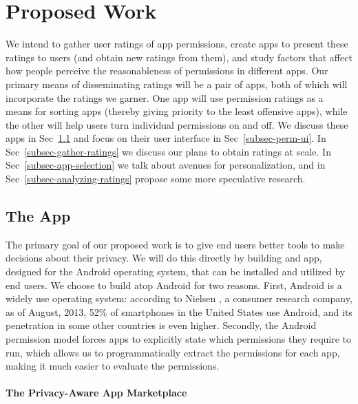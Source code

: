 \documentclass[11pt]{article}
\begin{document}
\section{Proposed Work}

We intend to gather user ratings of app permissions, create apps to present these ratings
to users (and obtain new ratings from them), and study factors that
affect how people perceive the reasonableness of permissions in
different apps. Our primary means of disseminating ratings will be
a pair of apps, both of which will incorporate the ratings we
garner. One app will use permission ratings as a means for sorting
apps (thereby giving priority to the least offensive apps),
while the other will help users turn individual permissions on and
off. We discuss these apps in Sec~\ref{subsec-the-apps} and focus on 
their user interface in Sec~\ref{subsec-perm-ui}. In Sec~\ref{subsec-gather-ratings} 
we discuss our plans to obtain ratings at scale. In
Sec~\ref{subsec-app-selection} we talk about avenues for personalization, and in
Sec~\ref{subsec-analyzing-ratings} propose
some more speculative research.

\subsection{The App}
\label{subsec-the-apps}

The primary goal of our proposed work is to give end users better tools to make decisions
about their privacy. We will do this directly by building and app, designed for the Android 
operating system, that can be installed 
and utilized by end users. We choose to build atop Android for two reasons.
First, Android is a widely use operating system: according to Nielsen 
\cite{android-market-share}, a consumer research 
company, as of August, 2013, 52\% of smartphones in the United
States use Android, and its penetration in some other countries is
even higher.
Secondly, the Android permission model forces apps to explicitly state which permissions
they require to run, which allows us to programmatically extract the permissions for each 
app, making it much easier to evaluate the permissions. 

\paragraph{The Privacy-Aware App Marketplace}
\label{subsubsec-privacy-store}
\end{document}
